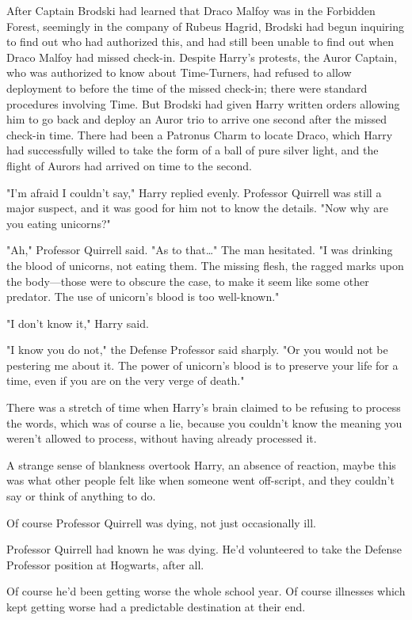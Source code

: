 After Captain Brodski had learned that Draco Malfoy was in the Forbidden 
Forest, seemingly in the company of Rubeus Hagrid, Brodski had begun inquiring 
to find out who had authorized this, and had still been unable to find out when 
Draco Malfoy had missed check-in. Despite Harry's protests, the Auror Captain, 
who was authorized to know about Time-Turners, had refused to allow deployment 
to before the time of the missed check-in; there were standard procedures 
involving Time. But Brodski had given Harry written orders allowing him to go 
back and deploy an Auror trio to arrive one second after the missed check-in 
time. There had been a Patronus Charm to locate Draco, which Harry had 
successfully willed to take the form of a ball of pure silver light, and the 
flight of Aurors had arrived on time to the second.

"I'm afraid I couldn't say," Harry replied evenly. Professor Quirrell was still 
a major suspect, and it was good for him not to know the details. "Now why are 
you eating unicorns?"

"Ah," Professor Quirrell said. "As to that…" The man hesitated. "I was drinking 
the blood of unicorns, not eating them. The missing flesh, the ragged marks 
upon the body---those were to obscure the case, to make it seem like some other 
predator. The use of unicorn's blood is too well-known."

"I don't know it," Harry said.

"I know you do not," the Defense Professor said sharply. "Or you would not be 
pestering me about it. The power of unicorn's blood is to preserve your life 
for a time, even if you are on the very verge of death."

There was a stretch of time when Harry's brain claimed to be refusing to 
process the words, which was of course a lie, because you couldn't know the 
meaning you weren't allowed to process, without having already processed it.

A strange sense of blankness overtook Harry, an absence of reaction, maybe this 
was what other people felt like when someone went off-script, and they couldn't 
say or think of anything to do.

Of course Professor Quirrell was dying, not just occasionally ill.

Professor Quirrell had known he was dying. He'd volunteered to take the Defense 
Professor position at Hogwarts, after all.

Of course he'd been getting worse the whole school year. Of course illnesses 
which kept getting worse had a predictable destination at their end.

